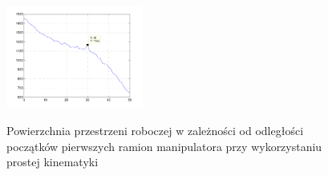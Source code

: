 \documentclass[printmode]{mgr}
\begin{document}
\begin{figure}[tp]
{	  \includegraphics[width=0.4\textwidth]{grafika/probna/Forward/L=30}
	} \\
  \label{rys:probna_wersja_prosta_kin}  
  \caption{Powierzchnia przestrzeni roboczej w zależności od odległości początków pierwszych ramion 
  manipulatora przy wykorzystaniu prostej kinematyki}

\end{figure}
\end{document}

